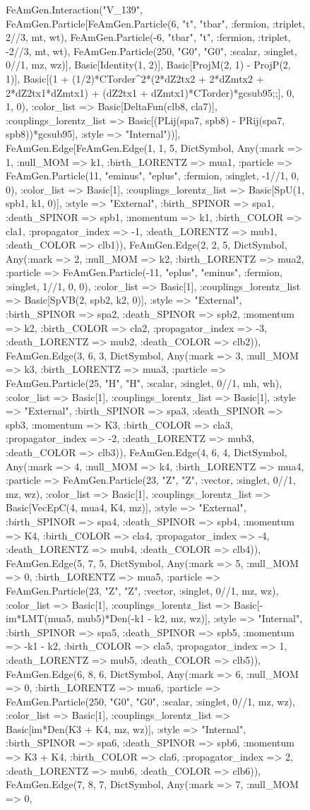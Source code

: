 \documentclass{revtex4}
\begin{document}
\begin{figure}[!htb]
\begin{center}
{FeAmGen.Interaction("V_139", FeAmGen.Particle[FeAmGen.Particle(6, "t", "tbar", :fermion, :triplet, 2//3, mt, wt), FeAmGen.Particle(-6, "tbar", "t", :fermion, :triplet, -2//3, mt, wt), FeAmGen.Particle(250, "G0", "G0", :scalar, :singlet, 0//1, mz, wz)], Basic[Identity(1, 2)], Basic[ProjM(2, 1) - ProjP(2, 1)], Basic[(1 + (1/2)*CTorder^2*(2*dZ2tx2 + 2*dZmtx2 + 2*dZ2tx1*dZmtx1) + (dZ2tx1 + dZmtx1)*CTorder)*gcsub95;;], 0, 1, 0), :color_list => Basic[DeltaFun(clb8, cla7)], :couplings_lorentz_list => Basic[(PLij(spa7, spb8) - PRij(spa7, spb8))*gcsub95], :style => "Internal"))], FeAmGen.Edge[FeAmGen.Edge(1, 1, 5, Dict{Symbol, Any}(:mark => 1, :null_MOM => k1, :birth_LORENTZ => mua1, :particle => FeAmGen.Particle(11, "eminus", "eplus", :fermion, :singlet, -1//1, 0, 0), :color_list => Basic[1], :couplings_lorentz_list => Basic[SpU(1, spb1, k1, 0)], :style => "External", :birth_SPINOR => spa1, :death_SPINOR => spb1, :momentum => k1, :birth_COLOR => cla1, :propagator_index => -1, :death_LORENTZ => mub1, :death_COLOR => clb1)), FeAmGen.Edge(2, 2, 5, Dict{Symbol, Any}(:mark => 2, :null_MOM => k2, :birth_LORENTZ => mua2, :particle => FeAmGen.Particle(-11, "eplus", "eminus", :fermion, :singlet, 1//1, 0, 0), :color_list => Basic[1], :couplings_lorentz_list => Basic[SpVB(2, spb2, k2, 0)], :style => "External", :birth_SPINOR => spa2, :death_SPINOR => spb2, :momentum => k2, :birth_COLOR => cla2, :propagator_index => -3, :death_LORENTZ => mub2, :death_COLOR => clb2)), FeAmGen.Edge(3, 6, 3, Dict{Symbol, Any}(:mark => 3, :null_MOM => k3, :birth_LORENTZ => mua3, :particle => FeAmGen.Particle(25, "H", "H", :scalar, :singlet, 0//1, mh, wh), :color_list => Basic[1], :couplings_lorentz_list => Basic[1], :style => "External", :birth_SPINOR => spa3, :death_SPINOR => spb3, :momentum => K3, :birth_COLOR => cla3, :propagator_index => -2, :death_LORENTZ => mub3, :death_COLOR => clb3)), FeAmGen.Edge(4, 6, 4, Dict{Symbol, Any}(:mark => 4, :null_MOM => k4, :birth_LORENTZ => mua4, :particle => FeAmGen.Particle(23, "Z", "Z", :vector, :singlet, 0//1, mz, wz), :color_list => Basic[1], :couplings_lorentz_list => Basic[VecEpC(4, mua4, K4, mz)], :style => "External", :birth_SPINOR => spa4, :death_SPINOR => spb4, :momentum => K4, :birth_COLOR => cla4, :propagator_index => -4, :death_LORENTZ => mub4, :death_COLOR => clb4)), FeAmGen.Edge(5, 7, 5, Dict{Symbol, Any}(:mark => 5, :null_MOM => 0, :birth_LORENTZ => mua5, :particle => FeAmGen.Particle(23, "Z", "Z", :vector, :singlet, 0//1, mz, wz), :color_list => Basic[1], :couplings_lorentz_list => Basic[-im*LMT(mua5, mub5)*Den(-k1 - k2, mz, wz)], :style => "Internal", :birth_SPINOR => spa5, :death_SPINOR => spb5, :momentum => -k1 - k2, :birth_COLOR => cla5, :propagator_index => 1, :death_LORENTZ => mub5, :death_COLOR => clb5)), FeAmGen.Edge(6, 8, 6, Dict{Symbol, Any}(:mark => 6, :null_MOM => 0, :birth_LORENTZ => mua6, :particle => FeAmGen.Particle(250, "G0", "G0", :scalar, :singlet, 0//1, mz, wz), :color_list => Basic[1], :couplings_lorentz_list => Basic[im*Den(K3 + K4, mz, wz)], :style => "Internal", :birth_SPINOR => spa6, :death_SPINOR => spb6, :momentum => K3 + K4, :birth_COLOR => cla6, :propagator_index => 2, :death_LORENTZ => mub6, :death_COLOR => clb6)), FeAmGen.Edge(7, 8, 7, Dict{Symbol, Any}(:mark => 7, :null_MOM => 0, }
\end{center}
\end{figure}
\end{document}

